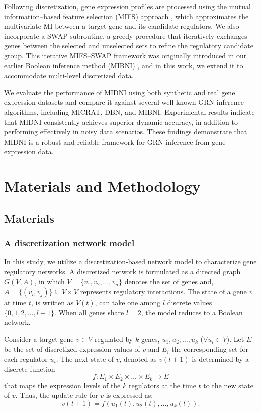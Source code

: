Following discretization, gene expression profiles are processed using the mutual information–based feature selection (MIFS) approach \parencite{Barman2017}, which approximates the multivariate MI between a target gene and its candidate regulators. We also incorporate a SWAP subroutine, a greedy procedure that iteratively exchanges genes between the selected and unselected sets to refine the regulatory candidate group. This iterative MIFS–SWAP framework was originally introduced in our earlier Boolean inference method (MIBNI) \parencite{Barman2017}, and in this work, we extend it to accommodate multi-level discretized data.

We evaluate the performance of MIDNI using both synthetic and real gene expression datasets and compare it against several well-known GRN inference algorithms, including MICRAT, DBN, and MIBNI. Experimental results indicate that MIDNI consistently achieves superior dynamic accuracy, in addition to performing effectively in noisy data scenarios. These findings demonstrate that MIDNI is a robust and reliable framework for GRN inference from gene expression data.

\section{Materials and Methodology}\label{chapter2_methodology}
\subsection{Materials}
\subsubsection{A discretization network model}

In this study, we utilize a discretization-based network model to characterize gene regulatory networks. A discretized network is formulated as a directed graph \( G(V, A) \), in which \( V = \{v_1, v_2, \dots, v_n\} \) denotes the set of genes and, 
\( A = \{(v_i, v_j)\} \subseteq V \times V \) represents regulatory interactions. The state of a gene \( v \) at time \( t \), is written as \( V(t) \), can take one among \( l \) discrete values \(\{0, 1, 2, \dots, l-1\}\). When all genes share \( l=2 \), the model reduces to a Boolean network.

Consider a target gene \( v \in V \) regulated by \( k \) genes, \( u_1, u_2, \dots, u_k \) (\( \forall u_i \in V \)). 
Let \( E \) be the set of discretized expression values of \( v \) and \( E_i \) the corresponding set for each regulator \( u_i \). 
The next state of \( v \), denoted as \( v(t+1) \) is determined by a discrete function 
\[
f: E_1 \times E_2 \times \dots \times E_k \rightarrow E
\] 
that maps the expression levels of the \( k \) regulators at the time \( t \) to the new state of \( v \). 
Thus, the update rule for \( v \) is expressed as:
\[
v(t+1) = f(u_1(t), u_2(t), \dots, u_k(t)).
\]

